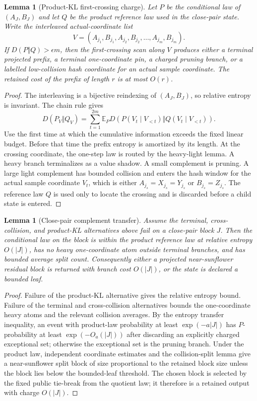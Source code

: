 \documentclass[11pt]{article}
\newtheorem{lemma}[theorem]{Lemma}
\theoremstyle{remark}
\newcommand{\E}{\mathbb E}
\begin{document}
\begin{lemma}[Product-KL first-crossing charge]\label{lem:app-kl-first-crossing}
Let $P$ be the conditional law of $(A_J,B_J)$ and let $Q$ be the product reference law used in the close-pair state.  Write the interleaved actual-coordinate list
\[
        V=(A_{j_1},B_{j_1},A_{j_2},B_{j_2},\ldots,A_{j_m},B_{j_m}).
\]
If $D(P\Vert Q)>\epsilon m$, then the first-crossing scan along $V$ produces either a terminal projected prefix, a terminal one-coordinate pin, a charged pruning branch, or a labelled low-collision hash coordinate for an actual sample coordinate.  The retained cost of the prefix of length $r$ is at most $O(r)$.
\end{lemma}

\begin{proof}
The interleaving is a bijective reindexing of $(A_J,B_J)$, so relative entropy is invariant.  The chain rule gives
\[
        D(P_V\Vert Q_V)=\sum_{t=1}^{2m}\E_P D(P(V_t\mid V_{<t})\Vert Q(V_t\mid V_{<t})).
\]
Use the first time at which the cumulative information exceeds the fixed linear budget.  Before that time the prefix entropy is amortized by its length.  At the crossing coordinate, the one-step law is routed by the heavy-light lemma.  A heavy branch terminalizes as a value shadow.  A small complement is pruning.  A large light complement has bounded collision and enters the hash window for the actual sample coordinate $V_t$, which is either $A_{j_s}=X_{j_s}=Y_{j_s}$ or $B_{j_s}=Z_{j_s}$.  The reference law $Q$ is used only to locate the crossing and is discarded before a child state is entered.
\end{proof}

\begin{lemma}[Close-pair complement transfer]\label{lem:app-complement-transfer}
Assume the terminal, cross-collision, and product-KL alternatives above fail on a close-pair block $J$.  Then the conditional law on the block is within the product reference law at relative entropy $O(|J|)$, has no heavy one-coordinate atom outside terminal branches, and has bounded average split count.  Consequently either a projected near-sunflower residual block is returned with branch cost $O(|J|)$, or the state is declared a bounded leaf.
\end{lemma}

\begin{proof}
Failure of the product-KL alternative gives the relative entropy bound.  Failure of the terminal and cross-collision alternatives bounds the one-coordinate heavy atoms and the relevant collision averages.  By the entropy transfer inequality, an event with product-law probability at least $\exp(-a|J|)$ has $P$-probability at least $\exp(-O_a(|J|))$ after discarding an explicitly charged exceptional set; otherwise the exceptional set is the pruning branch.  Under the product law, independent coordinate estimates and the collision-split lemma give a near-sunflower split block of size proportional to the retained block size unless the block lies below the bounded-leaf threshold.  The chosen block is selected by the fixed public tie-break from the quotient law; it therefore is a retained output with charge $O(|J|)$.
\end{proof}
\end{document}
